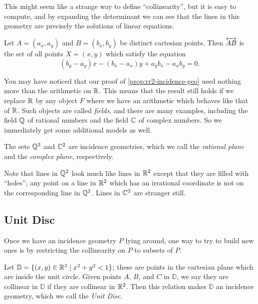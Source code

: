 This might seem like a strange way to define ``collinearity'', but it is easy to compute, and by expanding the determinant we can see that the lines in this geometry are precisely the solutions of linear equations.

\begin{cor}[Lines in $\RR^2$] \label{cor:cartesian-lines}
Let $A = (a_x, a_y)$ and $B = (b_x, b_y)$ be distinct cartesian points. Then $\overleftrightarrow{AB}$ is the set of all points $X = (x,y)$ which satisfy the equation \[ (b_y-a_y)x - (b_x-a_x)y + a_yb_x - a_xb_y = 0. \]
\end{cor}

You may have noticed that our proof of \ref{prop:rr2-incidence-geo} used nothing more than the arithmetic on $\mathbb{R}$. This means that the result still holds if we replace $\mathbb{R}$ by any object $F$ where we have an arithmetic which behaves like that of $\mathbb{R}$. Such objects are called \emph{fields}, and there are many examples, including the field $\mathbb{Q}$ of rational numbers and the field $\mathbb{C}$ of complex numbers. So we immediately get some additional models as well.

\begin{cor}
The sets $\mathbb{Q}^2$ and $\mathbb{C}^2$ are incidence geometries, which we call the \emph{rational plane} and the \emph{complex plane}, respectively.
\end{cor}

Note that lines in \(\mathbb{Q}^2\) look much like lines in \(\RR^2\) except that they are filled with ``holes''; any point on a line in \(\RR^2\) which has an irrational coordinate is not on the corresponding line in \(\mathbb{Q}^2\). Lines in \(\mathbb{C}^2\) are stranger still.



\subsection{Unit Disc}

Once we have an incidence geometry $P$ lying around, one way to try to build new ones is by restricting the collinearity on $P$ to subsets of $P$.

\begin{prop}
Let \(\mathbb{D} = \{ (x,y) \in \mathbb{R}^2 \mid x^2 + y^2 < 1 \}\); these are points in the cartesian plane which are inside the unit circle. Given points $A$, $B$, and $C$ in $\mathbb{D}$, we say they are collinear in $\mathbb{D}$ if they are collinear in $\RR^2$. Then this relation makes $\mathbb{D}$ an incidence geometry, which we call the \emph{Unit Disc}.
\end{prop}


